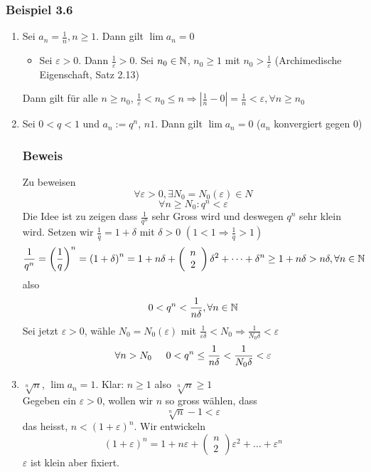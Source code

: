 \subsubsection*{Beispiel 3.6}
\begin{enumerate}
\item Sei $a_n=\frac{1}{n}, n\geq 1$. Dann gilt $\lim a_n=0$ 
\begin{itemize}
\item Sei $\varepsilon>0$. Dann $\frac{1}{\varepsilon}>0$. Sei $n_0\in\mathbb{N}$, $n_0\geq 1$ mit $n_0>\frac{1}{\varepsilon}$ (Archimedische Eigenschaft, Satz 2.13)\\ 
\end{itemize}
Dann gilt für alle $n\geq n_0$, $\frac{1}{\varepsilon}<n_0\leq n \Rightarrow \left| \frac{1}{n}-0\right| = \frac{1}{n}<\varepsilon, \forall n\geq n_0$
\item Sei $0<q<1$ und $a_n:=q^n$, $n 1$. Dann gilt $\lim a_n=0$ ($a_n$ konvergiert gegen 0)
\subsubsection*{Beweis}
Zu beweisen \[\forall \varepsilon > 0, \exists N_0=N_0(\varepsilon)\in N\]\[\forall n\geq N_0:q^n <\varepsilon\]
Die Idee ist zu zeigen dass $\frac{1}{q^n}$ sehr Gross wird und deswegen $q^n$ sehr klein wird. Setzen wir $\frac{1}{q}=1+\delta$ mit $\delta>0$ $\left( 1<1\Rightarrow \frac{1}{q}>1\right)$%
 $$\frac{1}{q^n}=\left( \frac{1}{q}\right)^n=\left( 1+\delta\right)^n=1+n\delta +\left( {\begin{array}{*{20}{c}}
n\\
2
\end{array}} \right) \delta^2+\dots+\delta^n\geq 1+n\delta>n\delta, \forall n\in\N$$
also \[0<q^n<\frac{1}{n\delta}, \forall n\in\mathbb{N}\]
Sei jetzt $\varepsilon >0$, wähle $N_0=N_0(\varepsilon)$ mit $\frac{1}{\varepsilon\delta}<N_0\Rightarrow \frac{1}{N_0\delta}<\varepsilon$
\[\forall n>N_0\hspace{5mm}0<q^n\leq\frac{1}{n\delta}<\frac{1}{N_0\delta}<\varepsilon\]
\item $\sqrt[n]{n}$, $\lim a_n=1$. Klar: $n\geq 1$ also $\sqrt[n]{n}\geq 1$\\
Gegeben ein $\varepsilon>0$, wollen wir $n$ so gross wählen, dass \[\sqrt[n]{n}-1 <\varepsilon\] das heisst, $n<\left( 1+\varepsilon \right)^n$. Wir entwickeln $$\left( 1+\varepsilon\right)^n=1+n\varepsilon+\left( {\begin{array}{*{20}{c}}
n\\
2
\end{array}} \right) \varepsilon^2 + \dots +\varepsilon^n$$
$\varepsilon$ ist klein aber fixiert.\\


\end{enumerate}
